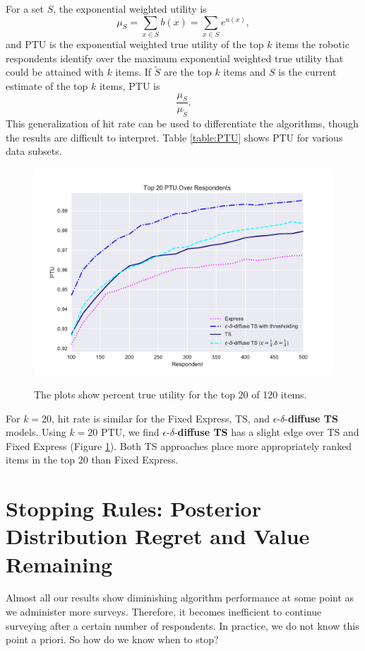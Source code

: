 \documentclass[nonblindrev]{informs3}
\newcommand{\edts}{$\epsilon$-$\delta$-\textbf{diffuse TS} }
\begin{document}
For a set $S$, the exponential weighted utility is \[\mu_S=\sum_{x \in S}b(x)=\sum_{x \in S}e^{u(x)},\]
and PTU is the exponential weighted true utility of the top $k$ items the robotic respondents identify over the maximum exponential weighted true utility that could be attained with $k$ items. If $\tilde{S}$ are the top $k$ items and $S$ is the current estimate of the top $k$ items, PTU is 
\[
\frac{\mu_S}{\mu_{\tilde{S}}}.
\]
This generalization of hit rate can be used to differentiate the algorithms, though the results are difficult to interpret. Table \ref{table:PTU} shows PTU for various data subsets.
\begin{figure}
\caption{The plots show percent true utility for the top 20 of 120 items.}
\includegraphics[width=1\textwidth]{plots/PTU120v20k20.pdf}
\label{fig:20util}
\end{figure}
For $k=20$, hit rate is similar for the Fixed Express, TS, and \edts models. Using $k=20$ PTU, we find \edts has a slight edge over TS and Fixed Express (Figure \ref{fig:20util}). Both TS approaches place more appropriately ranked items in the top 20 than Fixed Express.

\section{Stopping Rules: Posterior Distribution Regret and Value Remaining}

Almost all our results show diminishing algorithm performance at some point as we administer more surveys. Therefore, it becomes inefficient to continue surveying after a certain number of respondents. In practice, we do not know this point a priori. So how do we know when to stop?
\end{document}
